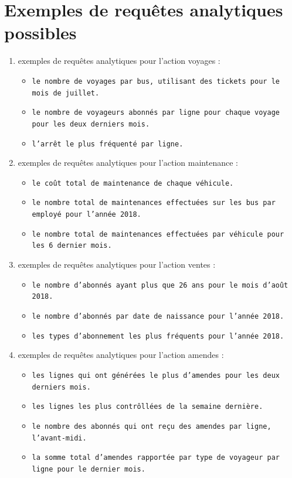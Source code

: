 \documentclass[a4paper,12pt]{report}
\begin{document}
\section{Exemples de requêtes analytiques possibles}
\begin{enumerate}
  \item exemples de requêtes analytiques pour l'action \og voyages \fg :
  \begin{itemize}
    \item \texttt{le nombre de voyages par bus, utilisant des tickets pour le mois de juillet.}
    \item \texttt{le nombre de voyageurs abonnés par ligne pour chaque voyage pour les deux derniers mois.}
    \item \texttt{l'arrêt le plus fréquenté par ligne.}
  \end{itemize}
  \item exemples de requêtes analytiques pour l'action \og maintenance \fg :
  \begin{itemize}
    \item \texttt{le coût total de maintenance de chaque véhicule.}
    \item \texttt{le nombre total de maintenances effectuées sur les bus par employé pour l'année 2018.}
    \item \texttt{le nombre total de maintenances effectuées par véhicule pour les 6 dernier mois.}
  \end{itemize}
  \item exemples de requêtes analytiques pour l'action \og ventes \fg :
  \begin{itemize}
    \item \texttt{le nombre d'abonnés ayant plus que 26 ans pour le mois d'août 2018.}
    \item \texttt{le nombre d'abonnés par date de naissance pour l'année 2018.}
    \item \texttt{les types d'abonnement les plus fréquents pour l'année 2018.}
  \end{itemize}
  \item exemples de requêtes analytiques pour l'action \og amendes \fg :
  \begin{itemize}
    \item \texttt{les lignes qui ont générées le plus d'amendes pour les deux derniers mois.}
    \item \texttt{les lignes les plus contrôllées de la semaine dernière.}
    \item \texttt{le nombre des abonnés qui ont reçu des amendes par ligne, l'avant-midi.}
    \item \texttt{la somme total d'amendes rapportée par type de voyageur par ligne pour le dernier mois.}
  \end{itemize}
\end{enumerate}
\end{document}

